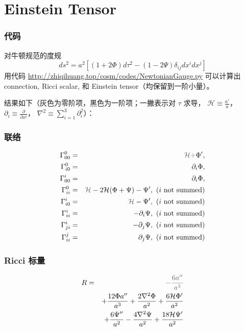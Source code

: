 \documentclass[CJK,13pt]{beamer}
\begin{document}
  \section{Einstein Tensor}

  \begin{frame}
    \frametitle{代码}
    对牛顿规范的度规
      {\blue $$ ds^2 = a^2\left[\left(1+2\Phi\right)d\tau^2 - \left(1-2\Psi\right)\delta_{ij}dx^idx^j\right]$$}    
      用代码
    \url{http://zhiqihuang.top/cosm/codes/NewtonianGauge.py}
    可以计算出connection, Ricci scalar, 和 Einstein tensor（均保留到一阶小量）。

    \skipline

    结果如下（灰色为零阶项，黑色为一阶项；一撇表示对 $\tau$ 求导， $\mathcal{H}\equiv\frac{a'}{a}$， $\partial_i\equiv \frac{\partial}{\partial x^i}$， $\nabla^2\equiv \sum_{i=1}^3 \partial_i^2$）：
  \end{frame}

  \begin{frame}
    \frametitle{联络}
     \begin{eqnarray}
\Gamma^{0}_{00} &=&{\gray \mathcal{H} + } \Phi',   \\
\Gamma^{0}_{i0} &=&  {\partial_i} \Phi,   \\
\Gamma^{i}_{00} &=&  {\partial_i} \Phi,   \\
\Gamma^{0}_{ii} &=& {\gray \mathcal{H} }- 2 \mathcal{H}(\Phi +\Psi) - \Psi'  ,\ \text{($i$ not summed)} \\
\Gamma^{i}_{i0} &=& {\gray \mathcal{H} }  -  \Psi' ,\ \text{($i$ not summed)} \\
\Gamma^{i}_{ii} &=& -  {\partial_i} \Psi ,\ \text{($i$ not summed)} \\
\Gamma^{i}_{ji} &=& -  {\partial_j} \Psi ,\ \text{($i$ not summed)} \\
\Gamma^{j}_{ii} &=&  {\partial_j} \Psi  ,\ \text{($i$ not summed)} 
\end{eqnarray}
  \end{frame}
  
  \begin{frame}
    \frametitle{Ricci 标量}
    \begin{eqnarray}
      R &=& {\gray - \frac{6 {a''}}{a^3 }} \nonumber \\
      && + \frac{12 \Phi  {a''}}{a^3 } + \frac{2 \nabla^2 \Phi }{a^2 } + \frac{6 \mathcal{H} \Phi' }{a^2 } \nonumber \\
      && + \frac{6\Psi'' }{a^2 } - \frac{4 \nabla^2 \Psi }{a^2 }  + \frac{18\mathcal{H}  \Psi'  }{a^2 }
      \end{eqnarray}
  \end{frame}
\end{document}
